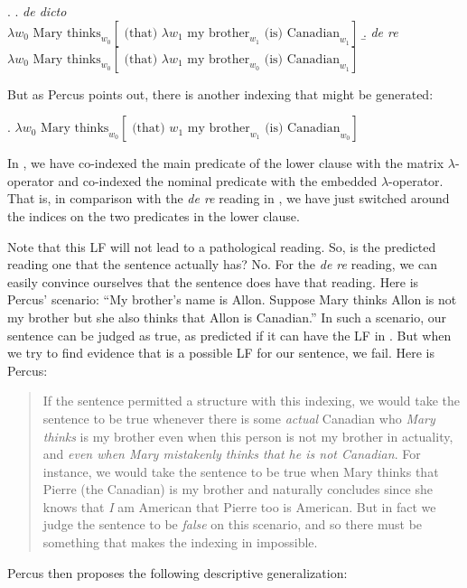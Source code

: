 \ex. \a. \emph{de dicto}\\
$\lambda w_{0} \mbox{ Mary thinks}_{w_{0}} [ \mbox{ (that) } \lambda w_{1} \mbox{ my brother}_{w_{1}} \mbox{ (is) Canadian}_{w_{1}} ]$
\b. \emph{de re}\\
$\lambda w_{0} \mbox{ Mary thinks}_{w_{0}} [ \mbox{ (that) } \lambda w_{1} \mbox{ my brother}_{w_{0}} \mbox{ (is) Canadian}_{w_{1}} ]$

But as Percus points out, there is another indexing that might be generated:

\ex. $\lambda w_{0} \mbox{ Mary thinks}_{w_{0}} [ \mbox{ (that) } w_{1} \mbox{ my brother}_{w_{1}} \mbox{ (is) Canadian}_{w_{0}} ]$

In \Last, we have co-indexed the main predicate of the lower clause with the matrix $\lambda$-operator and co-indexed the nominal predicate  with the embedded $\lambda$-operator. That is, in comparison with the \emph{de re} reading in \LLast[b], we have just switched around the indices on the two predicates in the lower clause.

Note that this LF will not lead to a pathological reading. So, is the predicted reading one that the sentence actually has? No. For the \emph{de re} reading, we can easily convince ourselves that the sentence does have that reading. Here is Percus' scenario: ``My brother's name is Allon. Suppose Mary thinks Allon is not my brother but she also thinks that Allon is Canadian.'' In such a scenario, our sentence can be judged as true, as predicted if it can have the LF in \LLast[b]. But when we try to find evidence that \Last is a possible LF for our sentence, we fail. Here is Percus:

\begin{quote}
  If the sentence permitted a structure with this indexing, we would take the sentence to be true whenever there is some \emph{actual} Canadian who \emph{Mary thinks} is my brother \dash even when this person is not my brother in actuality, and \emph{even when Mary mistakenly thinks that he is not Canadian}. For instance, we would take the sentence to be true when Mary thinks that Pierre (the Canadian) is my brother and naturally concludes \dash since she knows that \emph{I} am American \dash that Pierre too is American. But in fact we judge the sentence to be \emph{false} on this scenario, and so there must be something that makes the indexing in \Last impossible. 
\end{quote}
%
Percus then proposes the following descriptive generalization:

